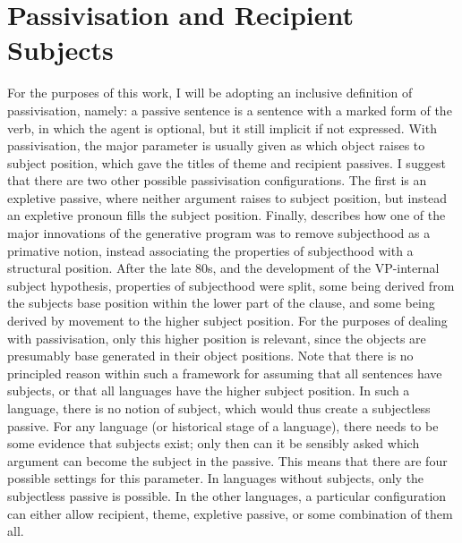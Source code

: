 \section{Passivisation and Recipient Subjects}\label{sec:paswo}
For the purposes of this work, I will be adopting an inclusive definition of passivisation, namely: a passive sentence is a sentence with a marked form of the verb, in which the agent is optional, but it still implicit if not expressed. With passivisation, the major parameter is usually given as which object raises to subject position, which \cite{Allen.1999} gave the titles of theme and recipient passives. I suggest that there are two other possible passivisation configurations. The first is an expletive passive, where neither argument raises to subject position, but instead an expletive pronoun fills the subject position. Finally, \cite{McCloskey.1997} describes how one of the major innovations of the generative program was to remove subjecthood as a primative notion, instead associating the properties of subjecthood with a structural position. After the late 80s, and the development of the VP-internal subject hypothesis, properties of subjecthood were split, some being derived from the subjects base position within the lower part of the clause, and some being derived by movement to the higher subject position. For the purposes of dealing with passivisation, only this higher position is relevant, since the objects are presumably base generated in their object positions. Note that there is no principled reason within such a framework for assuming that all sentences have subjects, or that all languages have the higher subject position. In such a language, there is no notion of subject, which would thus create a subjectless passive. For any language (or historical stage of a language), there needs to be some evidence that subjects exist; only then can it be sensibly asked which argument can become the subject in the passive. This means that there are four possible settings for this parameter. In languages without subjects, only the subjectless passive is possible. In the other languages, a particular configuration can either allow recipient, theme, expletive passive, or some combination of them all.

